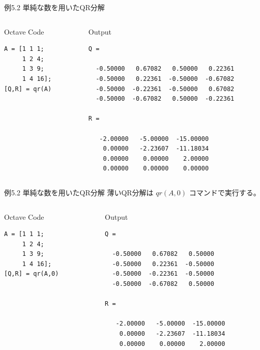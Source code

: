 \documentclass[dvipdfmx,10pt,presentation]{beamer}
\begin{document}
\begin{frame}[fragile,label={sec:org49751d2}]{例5.2 単純な数を用いたQR分解}
 \begin{columns}
\begin{column}{0.23\columnwidth}
\begin{block}{Octave Code}
\begin{verbatim}
A = [1 1 1;
     1 2 4; 
     1 3 9;
     1 4 16];
[Q,R] = qr(A)
\end{verbatim}
\end{block}
\end{column}

\begin{column}{0.73\columnwidth}
\begin{block}{Output}
\begin{verbatim}
Q =

  -0.50000   0.67082   0.50000   0.22361
  -0.50000   0.22361  -0.50000  -0.67082
  -0.50000  -0.22361  -0.50000   0.67082
  -0.50000  -0.67082   0.50000  -0.22361

R =

   -2.00000   -5.00000  -15.00000
    0.00000   -2.23607  -11.18034
    0.00000    0.00000    2.00000
    0.00000    0.00000    0.00000

\end{verbatim}
\end{block}
\end{column}
\end{columns}
\end{frame}

\begin{frame}[fragile,label={sec:orga2d1a9f}]{例5.2 単純な数を用いたQR分解}
 薄いQR分解は \(qr(A,0)\) コマンドで実行する。\\
\begin{columns}
\begin{column}{0.3\columnwidth}
\begin{block}{Octave Code}
\begin{verbatim}
A = [1 1 1;
     1 2 4; 
     1 3 9;
     1 4 16];
[Q,R] = qr(A,0)
\end{verbatim}
\end{block}
\end{column}
\begin{column}{0.65\columnwidth}
\begin{block}{Output}
\begin{verbatim}
Q =

  -0.50000   0.67082   0.50000
  -0.50000   0.22361  -0.50000
  -0.50000  -0.22361  -0.50000
  -0.50000  -0.67082   0.50000

R =

   -2.00000   -5.00000  -15.00000
    0.00000   -2.23607  -11.18034
    0.00000    0.00000    2.00000

\end{verbatim}
\end{block}
\end{column}
\end{columns}
\end{frame}
\end{document}
